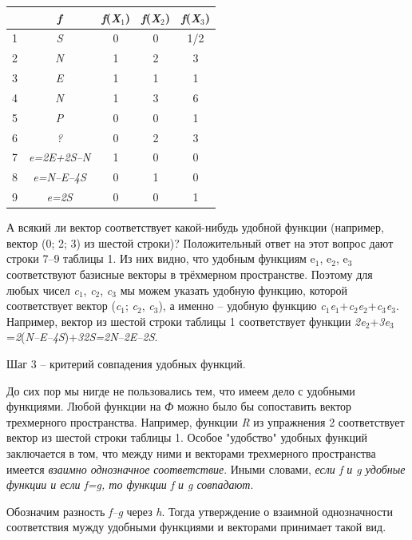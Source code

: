 \documentclass[main.tex]{subfiles}
\begin{document}
\begin{multicols}{2}
\noindent\begin{tabular}{|c|c|c|c|c|}
  \hline
  & \textit{f} & \textit{f}(\textit{X}${_1}$) & \textit{f}(\textit{X}${_2}$) & \textit{f}(\textit{X}${_3}$)      \\ \hline
  1 & \textit{S} & 0 & 0 & 1/2   \\ \hline
  2 & \textit{N} & 1 & 2 & 3   \\ \hline
  3 & \textit{E} & 1 & 1 & 1 \\ \hline
  4 & \textit{N} & 1 & 3 & 6   \\ \hline
  5 & \textit{P} & 0 & 0 & 1   \\ \hline
  6 & \textit{?} & 0 & 2 & 3 \\ \hline
  7 & \textit{e=2E+2S–N} & 1 & 0 & 0   \\ \hline
  8 & \textit{e=N–E–4S} & 0 & 1 & 0   \\ \hline
  9 & \textit{e=2S} & 0 & 0 & 1 \\ \hline
  \hline
\end{tabular}


А всякий ли вектор соответствует какой-нибудь удобной функции (например, вектор (0; 2; 3) из шестой строки)? Положительный ответ на этот вопрос дают строки 7–9 таблицы 1. Из них видно, что удобным функциям e${_1}$, e${_2}$, e${_3}$ соответствуют базисные векторы в трёхмерном пространстве. Поэтому для любых чисел \textit{c}${_1}$, \textit{c}${_2}$, \textit{c}${_3}$ мы можем указать удобную функцию, которой соответствует вектор (\textit{c}${_1}$; \textit{c}${_2}$, \textit{c}${_3}$), а именно – удобную функцию \textit{c}${_1}$\textit{e}${_1}$+\textit{c}${_2}$\textit{e}${_2}$+\textit{c}${_3}$\textit{e}${_3}$. Например, вектор из шестой строки таблицы 1 соответствует функции \textit{2e}${_2}$+\textit{3e}${_3}$=\textit{2}(\textit{N–E–4S})+\textit{3}\cdot\textit{2S=2N–2E–2S}.

\noindent\textcolor[rgb]{0.99,0.05,0.75}{Шаг 3 – критерий совпадения удобных функций.}

До сих пор мы нигде не пользовались тем, что имеем дело с удобными функциями. Любой функции на \textit{Ф} можно было бы сопоставить вектор трехмерного пространства. Например, функции \textit{R} из упражнения 2 соответствует вектор из шестой строки таблицы 1. Особое "удобство" удобных функций заключается в том, что между ними и векторами трехмерного пространства имеется \textit{взаимно однозначное соответствие}. Иными словами, \textit{если f и g удобные функции и если f=g, то функции f и g совпадают}.

Обозначим разность \textit{f–g} через \textit{h}. Тогда утверждение о взаимной однозначности соответствия мужду удобными функциями и векторами принимает такой вид.


\end{multicols}
\end{document}
